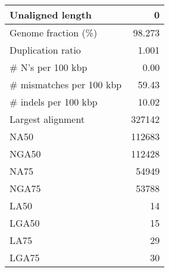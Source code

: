 \documentclass[12pt,a4paper]{article}
\begin{document}
\begin{table}[ht]
\begin{center}
\begin{tabular}{|l*{1}{|r}|}
Unaligned length & 0 \\ \hline
Genome fraction (\%) & 98.273 \\ \hline
Duplication ratio & 1.001 \\ \hline
\# N's per 100 kbp & 0.00 \\ \hline
\# mismatches per 100 kbp & 59.43 \\ \hline
\# indels per 100 kbp & 10.02 \\ \hline
Largest alignment & 327142 \\ \hline
NA50 & 112683 \\ \hline
NGA50 & 112428 \\ \hline
NA75 & 54949 \\ \hline
NGA75 & 53788 \\ \hline
LA50 & 14 \\ \hline
LGA50 & 15 \\ \hline
LA75 & 29 \\ \hline
LGA75 & 30 \\ \hline
\end{tabular}
\end{center}
\end{table}
\end{document}
